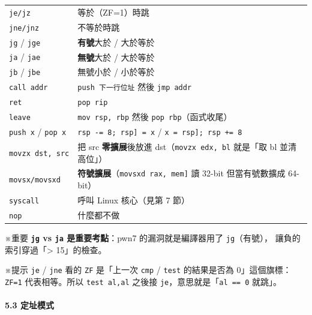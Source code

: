 \documentclass[10pt,a4paper]{article}
\renewenvironment{quote}{%
  \begin{mdframed}[linewidth=0pt,innerleftmargin=0pt,innerrightmargin=0pt,
    innerbottommargin=0pt,innertopmargin=0pt,skipabove=0.55em,skipbelow=0.55em,
    leftmargin=0.9em,rightmargin=0.4em,startcode={\color{quotebar}\vrule width 2.6pt},%
    endcode={}]%
  \itshape\color{black}%
}{%
  \end{mdframed}%
}
\begin{document}
{\begin{longtable}[]{@{}
  >{\raggedright\arraybackslash}p{}
  >{\raggedright\arraybackslash}p{}@{}}
\texttt{je/\allowbreak{}jz} & 等於（ZF=1）時跳 \\
\texttt{jne/\allowbreak{}jnz} & 不等於時跳 \\
\texttt{jg} / \texttt{jge} & \textbf{有號}大於 / 大於等於 \\
\texttt{ja} / \texttt{jae} & \textbf{無號}大於 / 大於等於 \\
\texttt{jb} / \texttt{jbe} & 無號小於 / 小於等於 \\
\texttt{call\ \allowbreak{}addr} & \texttt{push\ \allowbreak{}下一行位址} 然後
\texttt{jmp\ \allowbreak{}addr} \\
\texttt{ret} & \texttt{pop\ \allowbreak{}rip} \\
\texttt{leave} & \texttt{mov\ \allowbreak{}rsp,\allowbreak{}\ \allowbreak{}rbp} 然後
\texttt{pop\ \allowbreak{}rbp}（函式收尾） \\
\texttt{push\ \allowbreak{}x} / \texttt{pop\ \allowbreak{}x} &
\texttt{rsp\ \allowbreak{}-=\ \allowbreak{}8;\ \allowbreak{}{[}rsp{]}\ \allowbreak{}=\ \allowbreak{}x} /
\texttt{x\ \allowbreak{}=\ \allowbreak{}{[}rsp{]};\ \allowbreak{}rsp\ \allowbreak{}+=\ \allowbreak{}8} \\
\texttt{movzx\ \allowbreak{}dst,\allowbreak{}\ \allowbreak{}src} & 把 src \textbf{零擴展}後放進
dst（\texttt{movzx\ \allowbreak{}edx,\allowbreak{}\ \allowbreak{}bl} 就是「取 bl 並清高位」） \\
\texttt{movsx/\allowbreak{}movsxd} &
\textbf{符號擴展}（\texttt{movsxd\ \allowbreak{}rax,\allowbreak{}\ \allowbreak{}{[}mem{]}} 讀 32-bit
但當有號數擴成 64-bit） \\
\texttt{syscall} & 呼叫 Linux 核心（見第 7 節） \\
\texttt{nop} & 什麼都不做 \\
\end{longtable}
}

\begin{quote}
※重要 \textbf{\texttt{jg} vs \texttt{ja} 是重要考點}：pwn7
的漏洞就是編譯器用了 \texttt{jg}（有號），
讓負的索引穿過「\textgreater{} 15」的檢查。

※提示 \texttt{je} / \texttt{jne} 看的 \texttt{ZF} 是「上一次
\texttt{cmp} / \texttt{test} 的結果是否為 0」這個旗標： \texttt{ZF=1}
代表相等。所以 \texttt{test\ \allowbreak{}al,\allowbreak{}al} 之後接
\texttt{je}，意思就是「\texttt{al\ \allowbreak{}==\ \allowbreak{}0} 就跳」。
\end{quote}

\paragraph{5.3 定址模式}\label{ux5b9aux5740ux6a21ux5f0f}
\end{document}
